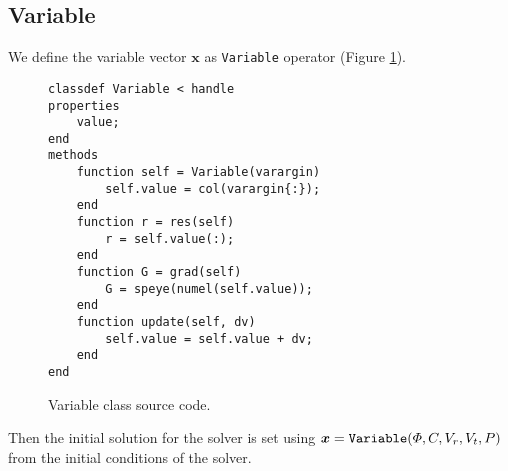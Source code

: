 \documentclass[MSc,beforeExam]{iitcsthesis}
\newcommand\bx{\boldsymbol{x}}
\begin{document}
\subsection{Variable}
We define the variable vector $\bx$ as \verb|Variable| 
operator (Figure \ref{fig:variable.m}).

\begin{figure}[htpb]
\begin{verbatim}
classdef Variable < handle
properties
    value;
end
methods
    function self = Variable(varargin)
        self.value = col(varargin{:});
    end
    function r = res(self)
        r = self.value(:);
    end
    function G = grad(self) 
        G = speye(numel(self.value));
    end
    function update(self, dv)
        self.value = self.value + dv;
    end
end
\end{verbatim}
\caption{Variable class source code.} \label{fig:variable.m}
\end{figure}
Then the initial solution for the solver is set using
$\bx = \verb|Variable|(\varPhi, C, V_r, V_t, P)$
from the initial conditions of the solver.
\end{document}
